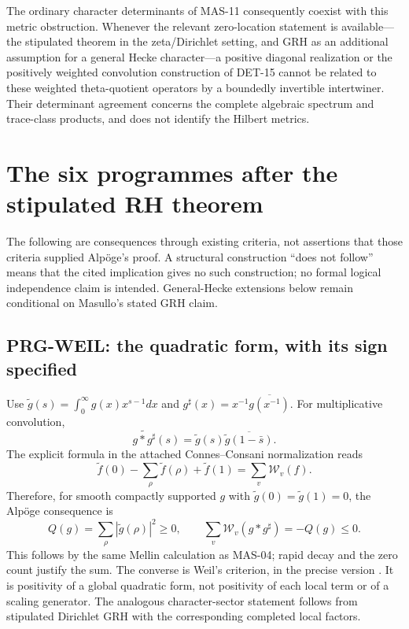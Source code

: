 \documentclass[11pt,a4paper]{article}
\newcommand{\fid}[1]{\textsf{#1}}
\begin{document}
The ordinary character determinants of \fid{MAS-11} consequently coexist with this metric obstruction. Whenever the relevant zero-location statement is available---the stipulated theorem in the zeta/Dirichlet setting, and GRH as an additional assumption for a general Hecke character---a positive diagonal realization or the positively weighted convolution construction of \fid{DET-15} cannot be related to these weighted theta-quotient operators by a boundedly invertible intertwiner. Their determinant agreement concerns the complete algebraic spectrum and trace-class products, and does not identify the Hilbert metrics.

\section{The six programmes after the stipulated RH theorem}
The following are consequences through existing criteria, not assertions that those criteria supplied Alp\"oge's proof. A structural construction ``does not follow'' means that the cited implication gives no such construction; no formal logical independence claim is intended. General-Hecke extensions below remain conditional on Masullo's stated GRH claim.

\subsection{PRG-WEIL: the quadratic form, with its sign specified}
Use $\widetilde g(s)=\int_0^\infty g(x)x^{s-1}dx$ and $g^\sharp(x)=x^{-1}\overline{g(x^{-1})}$. For multiplicative convolution,
\[
 \widetilde{g*g^\sharp}(s)=\widetilde g(s)\overline{\widetilde g(1-\bar s)}.
\]
The explicit formula in the attached Connes--Consani normalization reads
\[
 \widetilde f(0)-\sum_\rho\widetilde f(\rho)+\widetilde f(1)=\sum_v\mathcal W_v(f).
\]
Therefore, for smooth compactly supported $g$ with $\widetilde g(0)=\widetilde g(1)=0$, the Alp\"oge consequence is
\[
 Q(g)=\sum_\rho|\widetilde g(\rho)|^2\ge0,
 \qquad \sum_v\mathcal W_v(g*g^\sharp)=-Q(g)\le0.
\]
This follows by the same Mellin calculation as \fid{MAS-04}; rapid decay and the zero count justify the sum. The converse is Weil's criterion, in the precise version \cite[Appendix C, Proposition C.1, label \texttt{mainprop}]{cc}. It is positivity of a global quadratic form, not positivity of each local term or of a scaling generator. The analogous character-sector statement follows from stipulated Dirichlet GRH with the corresponding completed local factors.
\end{document}
